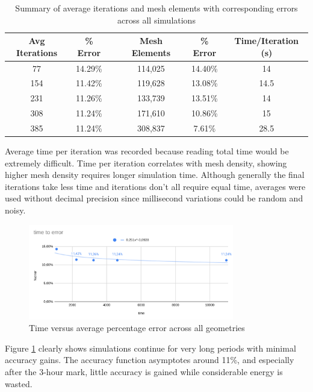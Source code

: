 \documentclass[12pt,a4paper]{article}
\begin{document}
\begin{table}[H]
\centering
\caption{Summary of average iterations and mesh elements with corresponding errors across all simulations}
\label{tab:overall_summary}
\begin{tabular}{|c|c|c|c|c|c|}
\hline
\rowcolor{lightblue}
\textbf{Avg Iterations} & \textbf{\% Error} & & \textbf{Mesh Elements} & \textbf{\% Error} & \textbf{Time/Iteration (s)} \\
\hline
77 & 14.29\% & & 114,025 & 14.40\% & 14 \\
\hline
154 & 11.42\% & & 119,628 & 13.08\% & 14.5 \\
\hline
231 & 11.26\% & & 133,739 & 13.51\% & 14 \\
\hline
308 & 11.24\% & & 171,610 & 10.86\% & 15 \\
\hline
385 & 11.24\% & & 308,837 & 7.61\% & 28.5 \\
\hline
\end{tabular}
\end{table}

Average time per iteration was recorded because reading total time would be extremely difficult. Time per iteration correlates with mesh density, showing higher mesh density requires longer simulation time. Although generally the final iterations take less time and iterations don't all require equal time, averages were used without decimal precision since millisecond variations could be random and noisy.

\begin{figure}[H]
    \centering
    \includegraphics[width=0.8\textwidth]{image6.png}
    \caption{Time versus average percentage error across all geometries}
    \label{fig:time_vs_error}
\end{figure}

Figure \ref{fig:time_vs_error} clearly shows simulations continue for very long periods with minimal accuracy gains. The accuracy function asymptotes around 11\%, and especially after the 3-hour mark, little accuracy is gained while considerable energy is wasted.
\end{document}
